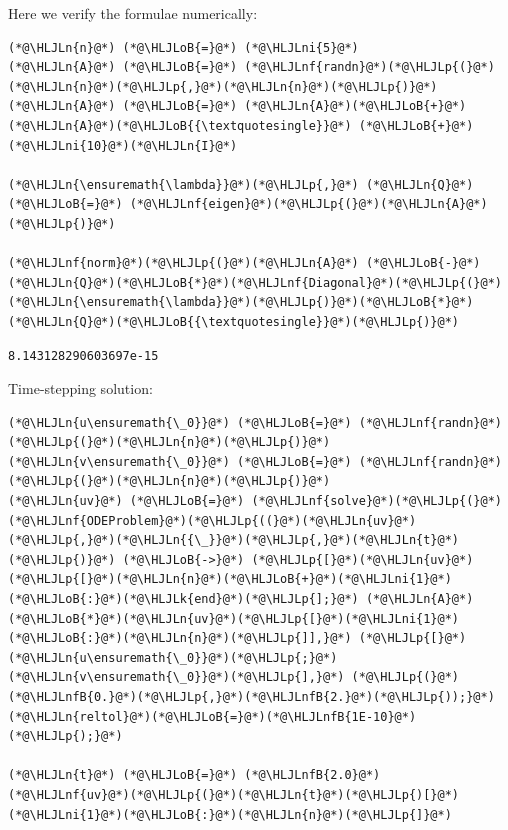 \documentclass[12pt,a4paper]{article}
\newcommand{\HLJLk}[1]{\textcolor[RGB]{148,91,176}{\textbf{#1}}}
\newcommand{\HLJLn}[1]{#1}
\newcommand{\HLJLnf}[1]{\textcolor[RGB]{66,102,213}{#1}}
\newcommand{\HLJLnfB}[1]{\textcolor[RGB]{59,151,46}{#1}}
\newcommand{\HLJLni}[1]{\textcolor[RGB]{59,151,46}{#1}}
\newcommand{\HLJLoB}[1]{\textcolor[RGB]{102,102,102}{\textbf{#1}}}
\newcommand{\HLJLp}[1]{#1}
\begin{document}
Here we verify the formulae numerically:


\begin{lstlisting}
(*@\HLJLn{n}@*) (*@\HLJLoB{=}@*) (*@\HLJLni{5}@*)
(*@\HLJLn{A}@*) (*@\HLJLoB{=}@*) (*@\HLJLnf{randn}@*)(*@\HLJLp{(}@*)(*@\HLJLn{n}@*)(*@\HLJLp{,}@*)(*@\HLJLn{n}@*)(*@\HLJLp{)}@*) 
(*@\HLJLn{A}@*) (*@\HLJLoB{=}@*) (*@\HLJLn{A}@*)(*@\HLJLoB{+}@*) (*@\HLJLn{A}@*)(*@\HLJLoB{{\textquotesingle}}@*) (*@\HLJLoB{+}@*) (*@\HLJLni{10}@*)(*@\HLJLn{I}@*)

(*@\HLJLn{\ensuremath{\lambda}}@*)(*@\HLJLp{,}@*) (*@\HLJLn{Q}@*) (*@\HLJLoB{=}@*) (*@\HLJLnf{eigen}@*)(*@\HLJLp{(}@*)(*@\HLJLn{A}@*)(*@\HLJLp{)}@*)

(*@\HLJLnf{norm}@*)(*@\HLJLp{(}@*)(*@\HLJLn{A}@*) (*@\HLJLoB{-}@*) (*@\HLJLn{Q}@*)(*@\HLJLoB{*}@*)(*@\HLJLnf{Diagonal}@*)(*@\HLJLp{(}@*)(*@\HLJLn{\ensuremath{\lambda}}@*)(*@\HLJLp{)}@*)(*@\HLJLoB{*}@*)(*@\HLJLn{Q}@*)(*@\HLJLoB{{\textquotesingle}}@*)(*@\HLJLp{)}@*)
\end{lstlisting}

\begin{lstlisting}
8.143128290603697e-15
\end{lstlisting}


Time-stepping solution:


\begin{lstlisting}
(*@\HLJLn{u\ensuremath{\_0}}@*) (*@\HLJLoB{=}@*) (*@\HLJLnf{randn}@*)(*@\HLJLp{(}@*)(*@\HLJLn{n}@*)(*@\HLJLp{)}@*)
(*@\HLJLn{v\ensuremath{\_0}}@*) (*@\HLJLoB{=}@*) (*@\HLJLnf{randn}@*)(*@\HLJLp{(}@*)(*@\HLJLn{n}@*)(*@\HLJLp{)}@*)
(*@\HLJLn{uv}@*) (*@\HLJLoB{=}@*) (*@\HLJLnf{solve}@*)(*@\HLJLp{(}@*)(*@\HLJLnf{ODEProblem}@*)(*@\HLJLp{((}@*)(*@\HLJLn{uv}@*)(*@\HLJLp{,}@*)(*@\HLJLn{{\_}}@*)(*@\HLJLp{,}@*)(*@\HLJLn{t}@*)(*@\HLJLp{)}@*) (*@\HLJLoB{->}@*) (*@\HLJLp{[}@*)(*@\HLJLn{uv}@*)(*@\HLJLp{[}@*)(*@\HLJLn{n}@*)(*@\HLJLoB{+}@*)(*@\HLJLni{1}@*)(*@\HLJLoB{:}@*)(*@\HLJLk{end}@*)(*@\HLJLp{];}@*) (*@\HLJLn{A}@*)(*@\HLJLoB{*}@*)(*@\HLJLn{uv}@*)(*@\HLJLp{[}@*)(*@\HLJLni{1}@*)(*@\HLJLoB{:}@*)(*@\HLJLn{n}@*)(*@\HLJLp{]],}@*) (*@\HLJLp{[}@*)(*@\HLJLn{u\ensuremath{\_0}}@*)(*@\HLJLp{;}@*) (*@\HLJLn{v\ensuremath{\_0}}@*)(*@\HLJLp{],}@*) (*@\HLJLp{(}@*)(*@\HLJLnfB{0.}@*)(*@\HLJLp{,}@*)(*@\HLJLnfB{2.}@*)(*@\HLJLp{));}@*) (*@\HLJLn{reltol}@*)(*@\HLJLoB{=}@*)(*@\HLJLnfB{1E-10}@*)(*@\HLJLp{);}@*)

(*@\HLJLn{t}@*) (*@\HLJLoB{=}@*) (*@\HLJLnfB{2.0}@*)
(*@\HLJLnf{uv}@*)(*@\HLJLp{(}@*)(*@\HLJLn{t}@*)(*@\HLJLp{)[}@*)(*@\HLJLni{1}@*)(*@\HLJLoB{:}@*)(*@\HLJLn{n}@*)(*@\HLJLp{]}@*)
\end{lstlisting}
\end{document}
